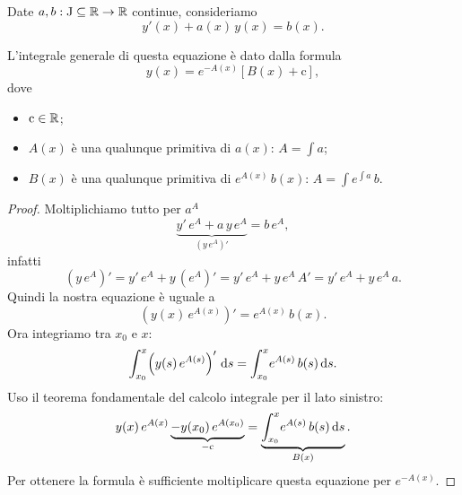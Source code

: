 \documentclass[../../analisi2]{subfiles}
\begin{document}
        \begin{teorema}
            Date \(a, b : \mathrm{J} \subseteq \mathbb{R} \to \mathbb{R}\) continue, consideriamo
            \[
                y'(x) + a(x) \, y(x) = b(x).
            \]

            L'integrale generale di questa equazione è dato dalla formula
            \[
                y(x) = e^{-A(x)} \left[B(x) + \mathrm{c}\right],
            \]
            dove
            \begin{itemize}
                \item \(\mathrm{c} \in \mathbb{R}\);
                \item \(A(x)\) è una qualunque primitiva di \(a(x)\): \(A = \int \! a\);
                \item \(B(x)\) è una qualunque primitiva di \(e^{A(x)} \, b(x)\): \(A = \int \! e^{\int \! a} \, b\).
            \end{itemize}
        \end{teorema}
        \begin{proof}
            Moltiplichiamo tutto per \(a^A\)
            \[
                \underbrace{y' \, e^A + a \, y \, e^A}_{\left(y \, e^A\right)'} = b \, e^A,
            \]
            infatti
            \[
                \left(y \, e^A\right)' = y' \, e^A + y \, \left(e^A\right)' = y' \, e^A + y \, e^A \, A' = y' \, e^A + y \, e^A \, a.
            \]
            Quindi la nostra equazione è uguale a
            \[
                \left(y(x) \, e^{A(x)}\right)' = e^{A(x)} \, b(x).
            \]
            Ora integriamo tra \(x_0\) e \(x\):
            \[
                \int_{x_0}^{x} \! \left(y(s) \, e^{A(s)}\right)' \, \mathrm{d}s = \int_{x_0}^{x} \! e^{A(s)} \, b(s) \, \mathrm{d}s.
            \]
            Uso il teorema fondamentale del calcolo integrale per il lato sinistro:
            \[
                y(x) \, e^{A(x)} \underbrace{- y(x_0) \, e^{A(x_0)}}_{- \mathrm{c}} = \underbrace{\int_{x_0}^{x} \! e^{A(s)} \, b(s) \, \mathrm{d}s}_{B(x)}.
            \]
            Per ottenere la formula è sufficiente moltiplicare questa equazione per \(e^{-A(x)}\).
        \end{proof}
            
\end{document}
